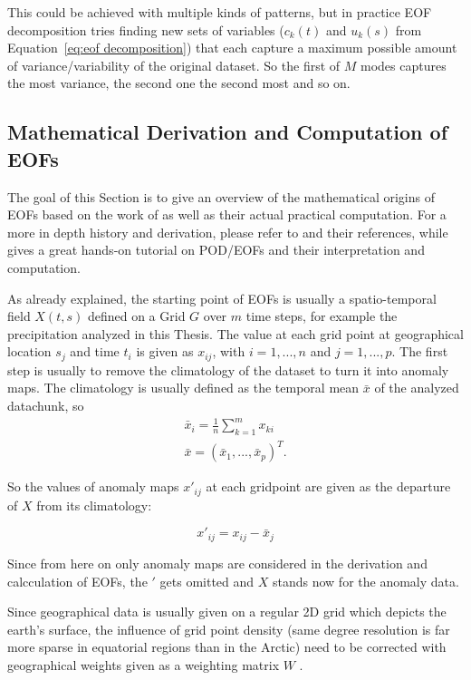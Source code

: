 This could be achieved with multiple kinds of patterns, but in practice EOF decomposition tries finding new sets of variables ($c_k(t)$ and $u_k(s)$ from Equation~\ref{eq:eof decomposition}) that each capture a maximum possible amount of variance/variability of the original dataset. 
So the first of $M$ modes captures the most variance, the second one the second most and so on. 

\subsection{Mathematical Derivation and Computation of EOFs}

The goal of this Section is to give an overview of the mathematical origins of EOFs based on the work of  as well as their actual practical computation. 
For a more in depth history and derivation, please refer to \cite{hannachi_empirical_2007} and their references, while  gives a great hands-on tutorial on POD/EOFs and their interpretation and computation. 

As already explained, the starting point of EOFs is usually a spatio-temporal field $X(t, s)$ defined on a Grid $G$ over $m$ time steps, for example the precipitation analyzed in this Thesis. 
The value at each grid point at geographical location $s_j$ and time $t_i$ is given as $x_{ij}$, with $i = 1, ..., n$  and $j = 1, ..., p$.  
The first step is usually to remove the climatology of the dataset to turn it into anomaly maps. 
The climatology is usually defined as the temporal mean $\bar{x}$ of the analyzed datachunk, so 
\begin{align}
  \bar{x}_i = \frac{1}{n} \sum^{m}_{k=1} x_{ki} \\
  \bar{x} = (\bar{x}_1, ..., \bar{x}_p)^T .
  \label{eq:climatology}
\end{align}

So the values of anomaly maps $x'_{ij}$ at each gridpoint are given as the departure of $X$ from its climatology: 

\begin{equation}
  x'_{ij} = x_{ij} - \bar{x}_j
  \label{eq:anomaly map}
\end{equation}

Since from here on only anomaly maps are considered in the derivation and calcculation of EOFs, the $'$ gets omitted and $X$ stands now for the anomaly data.  

Since geographical data is usually given on a regular 2D grid which depicts the earth's surface, the influence of grid point density (same degree resolution is far more sparse in equatorial regions than in the Arctic) need to be corrected with geographical weights given as a weighting matrix $W$ \cite{vietinghoffdiss}. 

  
